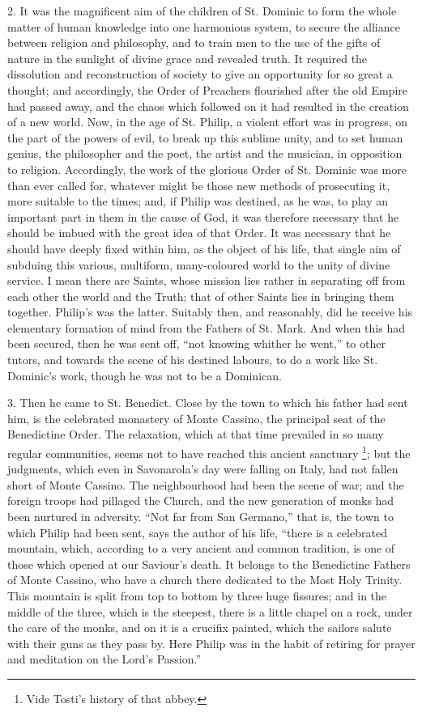 2. It was the magnificent aim of the children of St.
Dominic to form the whole matter of human knowledge into
one harmonious system, to secure the alliance between
religion and philosophy, and to train men to the use of
the gifts of nature in the sunlight of divine grace and
revealed truth. It required the dissolution and
reconstruction of society to give an opportunity for so
great a thought; and accordingly, the Order of Preachers
flourished after the old Empire had passed away, and the
chaos which followed on it had resulted in the creation
of a new world. Now, in the age of St. Philip, a violent
effort was in progress, on the part of the powers of
evil, to break up this sublime unity, and to set human
genius, the philosopher and the poet, the artist and the
musician, in opposition to religion. Accordingly, the
work of the glorious Order of St. Dominic was more than
ever called for, whatever might be those new methods of
prosecuting it, more suitable to the times; and, if
Philip was destined, as he was, to play an important part
in them in the cause of God, it was therefore necessary
that he should be imbued with the great idea of that
Order. It was necessary that he should have deeply fixed
within him, as the object of his life, that single aim of
subduing this various, multiform, many-coloured world to
the unity of divine service. I mean there are Saints,
whose mission lies rather in separating off from each
other the world and the Truth; that of other Saints lies
in bringing them together. Philip's was the latter.
Suitably then, and reasonably, did he receive his
elementary formation of mind from the Fathers of St.
Mark. And when this had been secured, then he was sent off, ``not knowing whither he went,'' to other
tutors, and towards the scene of his destined labours, to
do a work like St. Dominic's work, though he was not to be a Dominican.

3. Then he came to St. Benedict. Close by the town to
which his father had sent him, is the celebrated
monastery of Monte Cassino, the principal seat of the
Benedictine Order. The relaxation, which at that time
prevailed in so many regular communities, seems not to
have reached this ancient sanctuary \footnote{Vide Tosti's history of that abbey.}; but the
judgments, which even in Savonarola's day were falling on
Italy, had not fallen short of Monte Cassino. The
neighbourhood had been the scene of war; and the foreign
troops had pillaged the Church, and the new generation of
monks had been nurtured in adversity. ``Not far from
San Germano,'' that is, the town to which Philip had
been sent, says the author of his life, ``there is a
celebrated mountain, which, according to a very ancient
and common tradition, is one of those which opened at our
Saviour's death. It belongs to the Benedictine Fathers of
Monte Cassino, who have a church there dedicated to the
Most Holy Trinity. This mountain is split from top to
bottom by three huge fissures; and in the middle of the
three, which is the steepest, there is a little chapel on
a rock, under the care of the monks, and on it is a
crucifix painted, which the sailors salute with their
guns as they pass by. Here Philip was in the habit of
retiring for prayer and meditation on the Lord's
Passion.''

